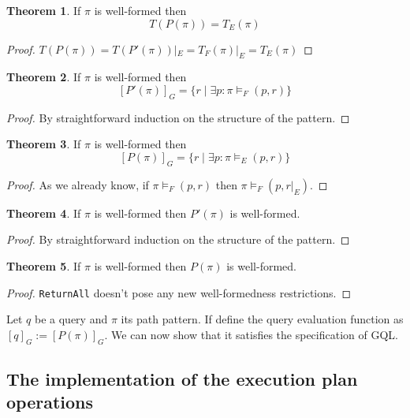 \documentclass[14pt]{constructor-thesis}
\theoremstyle{definition}
\newtheorem*{theorem}{Theorem}
\begin{document}
\begin{theorem} If $\pi$ is well-formed then
  $$T(P(\pi)) = T_E(\pi)$$
\end{theorem}
\begin{proof}
  $ T(P(\pi)) = T(P'(\pi))|_E = T_F(\pi)|_E = T_E(\pi) $
\end{proof}

\begin{theorem} If $\pi$ is well-formed then
  $$[P'(\pi)]_G = \{ r \mid \exists p : \pi \models_F (p, r) \}$$
\end{theorem}
\begin{proof}
  By straightforward induction on the structure of the pattern.
\end{proof}

\begin{theorem} If $\pi$ is well-formed then
  $$[P(\pi)]_G = \{ r \mid \exists p : \pi \models_E (p, r) \}$$
\end{theorem}
\begin{proof}
  As we already know, if $\pi \models_F (p, r)$ then $\pi \models_F (p, r|_E)$.
\end{proof}

\begin{theorem}
  If $\pi$ is well-formed then $P'(\pi)$ is well-formed.
\end{theorem}
\begin{proof}
  By straightforward induction on the structure of the pattern.
\end{proof}

\begin{theorem}
  If $\pi$ is well-formed then $P(\pi)$ is well-formed.
\end{theorem}
\begin{proof}
  \texttt{ReturnAll} doesn't pose any new well-formedness restrictions.
\end{proof}

Let $q$ be a query and $\pi$ its path pattern. If define the query evaluation function as $[q]_G := [P(\pi)]_G$. We can now show that it satisfies the specification of GQL.


\subsection{The implementation of the execution plan operations}


\end{document}
